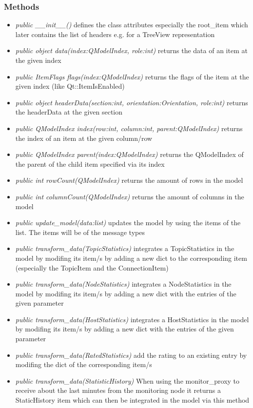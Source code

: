 \subsubsection{Methods}
\begin{itemize}
  \item \textit{public \_\_init\_\_()} defines the class attributes especially the root\_item which later contains the list of headers e.g. for a TreeView representation
  \item \textit{public object data(index:QModelIndex, role:int)} returns the data of an item at the given index
  \item \textit{public ItemFlags flags(index:QModelIndex)} returns the flags of the item at the given index (like Qt::ItemIsEnabled)
  \item \textit{public object headerData(section:int, orientation:Orientation, role:int)} returns the headerData  at the given section
  \item \textit{public QModelIndex index(row:int, column:int, parent:QModelIndex)} returns the index of an item at the given column/row
  \item \textit{public QModelIndex parent(index:QModelIndex)} returns the QModelIndex of the parent of the child item specified via its index
  \item \textit{public int rowCount(QModelIndex)} returns the amount of rows in the model
  \item \textit{public int columnCount(QModelIndex)} returns the amount of columns in the model
  \item \textit{public update\_model(data:list)} updates the model by using the items of the list. The items will be of the message types 
  \item \textit{public transform\_data(TopicStatistics)} integrates a TopicStatistics in the model by modifing its item/s by adding a new dict to the corresponding item (especially the TopicItem and the ConnectionItem)
  \item \textit{public transform\_data(NodeStatistics)} integrates a NodeStatistics in the model by modifing its item/s by adding a new dict with the entries of the given parameter
  \item \textit{public transform\_data(HostStatistics)} integrates a HostStatistics in the model by modifing its item/s by adding a new dict with the entries of the given parameter
  \item \textit{public transform\_data(RatedStatistics)} add the rating to an existing entry by modifing the dict of the corresponding item/s
  \item \textit{public transform\_data(StatisticHistory)} When using the monitor\_proxy to receive about the last minutes from the monitoring node
  it returns a StaticHistory item which can then be integrated in the model via this method
  \end{itemize}


